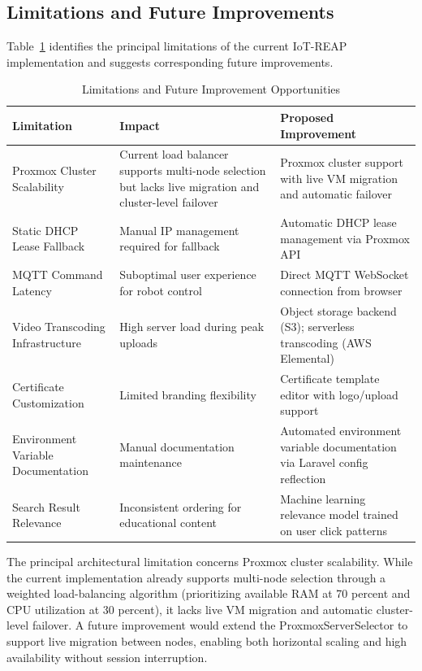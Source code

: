 \subsection{Limitations and Future Improvements}

Table~\ref{tab:limitations} identifies the principal limitations of the current IoT-REAP implementation and suggests corresponding future improvements.

\begin{table}[H]
\centering
\caption{Limitations and Future Improvement Opportunities}
\label{tab:limitations}
\begin{tabular}{|p{4.5cm}|p{4.5cm}|p{5.5cm}|}
\hline
\textbf{Limitation} & \textbf{Impact} & \textbf{Proposed Improvement} \\
\hline
Proxmox Cluster Scalability & Current load balancer supports multi-node selection but lacks live migration and cluster-level failover & Proxmox cluster support with live VM migration and automatic failover \\
\hline
Static DHCP Lease Fallback & Manual IP management required for fallback & Automatic DHCP lease management via Proxmox API \\
\hline
MQTT Command Latency & Suboptimal user experience for robot control & Direct MQTT WebSocket connection from browser \\
\hline
Video Transcoding Infrastructure & High server load during peak uploads & Object storage backend (S3); serverless transcoding (AWS Elemental) \\
\hline
Certificate Customization & Limited branding flexibility & Certificate template editor with logo/upload support \\
\hline
Environment Variable Documentation & Manual documentation maintenance & Automated environment variable documentation via Laravel config reflection \\
\hline
Search Result Relevance & Inconsistent ordering for educational content & Machine learning relevance model trained on user click patterns \\
\hline
\end{tabular}
\end{table}

The principal architectural limitation concerns Proxmox cluster scalability. While the current implementation already supports multi-node selection through a weighted load-balancing algorithm (prioritizing available RAM at 70 percent and CPU utilization at 30 percent), it lacks live VM migration and automatic cluster-level failover. A future improvement would extend the ProxmoxServerSelector to support live migration between nodes, enabling both horizontal scaling and high availability without session interruption.

